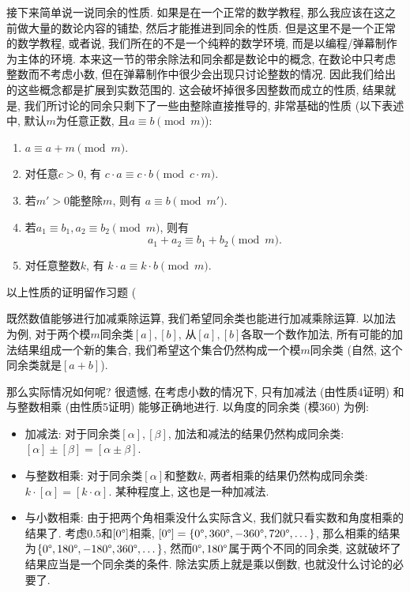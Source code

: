 接下来简单说一说同余的性质.
如果是在一个正常的数学教程,
那么我应该在这之前做大量的数论内容的铺垫,
然后才能推进到同余的性质.
但是这里不是一个正常的数学教程,
或者说, 我们所在的不是一个纯粹的数学环境,
而是以编程/弹幕制作为主体的环境.
本来这一节的带余除法和同余都是数论中的概念,
在数论中只考虑整数而不考虑小数,
但在弹幕制作中很少会出现只讨论整数的情况.
因此我们给出的这些概念都是扩展到实数范围的.
这会破坏掉很多因整数而成立的性质, 结果就是,
我们所讨论的同余只剩下了一些由整除直接推导的, 非常基础的性质
(以下表述中, 默认$m$为任意正数, 且$a \equiv b \pmod{m}$):
\begin{enumerate}[label=\arabic*.]
  \item $a \equiv a+m \pmod{m}$.
  \item 对任意$c>0$, 有
        $c \cdot a \equiv c \cdot b \pmod{c \cdot m}$.
  \item 若$m'>0$能整除$m$, 则有
        $a \equiv b \pmod{m'}$.
  \item 若$a_1 \equiv b_1, a_2 \equiv b_2 \pmod{m}$,
        则有\[a_1+a_2 \equiv b_1+b_2 \pmod{m}.\]
  \item 对任意整数$k$, 有
        $k \cdot a \equiv k \cdot b \pmod{m}$.
\end{enumerate}

以上性质的证明留作习题 (

既然数值能够进行加减乘除运算,
我们希望同余类也能进行加减乘除运算.
以加法为例, 对于两个模$m$同余类$[a],[b]$,
从$[a],[b]$各取一个数作加法,
所有可能的加法结果组成一个新的集合,
我们希望这个集合仍然构成一个模$m$同余类
(自然, 这个同余类就是$[a+b]$).

那么实际情况如何呢? 很遗憾,
在考虑小数的情况下, 只有加减法 (由性质4证明)
和与整数相乘 (由性质5证明) 能够正确地进行.
以角度的同余类 (模360\degree) 为例:
\begin{itemize}
  \item 加减法: 对于同余类$[\alpha],[\beta]$,
        加法和减法的结果仍然构成同余类:
        $[\alpha]\pm[\beta] = [\alpha\pm\beta]$.
  \item 与整数相乘: 对于同余类$[\alpha]$和整数$k$,
        两者相乘的结果仍然构成同余类:
        $k\cdot[\alpha] = [k\cdot\alpha]$.
        某种程度上, 这也是一种加减法.
  \item 与小数相乘: 由于把两个角相乘没什么实际含义,
        我们就只看实数和角度相乘的结果了.
        考虑$0.5$和$[0\degree]$相乘,
        $[0\degree]=\{0\degree,360\degree,-360\degree,
          720\degree,\dots\}$,
        那么相乘的结果为$\{0\degree,180\degree,-180\degree,
          360\degree,\dots\}$,
        然而$0\degree,180\degree$属于两个不同的同余类,
        这就破坏了结果应当是一个同余类的条件.
        除法实质上就是乘以倒数, 也就没什么讨论的必要了.
\end{itemize}

